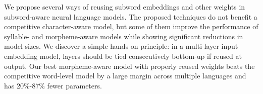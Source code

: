 We propose several ways of reusing  subword embeddings and other weights in subword-aware neural language models. The proposed techniques do not benefit a competitive character-aware model, but some of them improve the performance of syllable- and morpheme-aware models while showing significant reductions in model sizes. We discover a simple hands-on principle: in a multi-layer input embedding model, layers should be tied consecutively bottom-up if reused at output. Our best morpheme-aware model with properly reused weights beats the competitive word-level model by a large margin across multiple languages and has 20\%-87\% fewer parameters.
